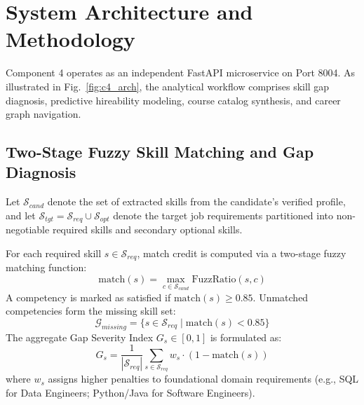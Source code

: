\documentclass[conference]{IEEEtran}
\begin{document}
\section{System Architecture and Methodology}
Component 4 operates as an independent FastAPI microservice on Port 8004. As illustrated in Fig.~\ref{fig:c4_arch}, the analytical workflow comprises skill gap diagnosis, predictive hireability modeling, course catalog synthesis, and career graph navigation.

\subsection{Two-Stage Fuzzy Skill Matching and Gap Diagnosis}
Let $\mathcal{S}_{cand}$ denote the set of extracted skills from the candidate's verified profile, and let $\mathcal{S}_{tgt} = \mathcal{S}_{req} \cup \mathcal{S}_{opt}$ denote the target job requirements partitioned into non-negotiable required skills and secondary optional skills.

For each required skill $s \in \mathcal{S}_{req}$, match credit is computed via a two-stage fuzzy matching function:
\begin{equation}
\text{match}(s) = \max_{c \in \mathcal{S}_{cand}} \text{FuzzRatio}(s, c)
\end{equation}
A competency is marked as satisfied if $\text{match}(s) \ge 0.85$. Unmatched competencies form the missing skill set:
\begin{equation}
\mathcal{G}_{missing} = \{s \in \mathcal{S}_{req} \mid \text{match}(s) < 0.85\}
\end{equation}
The aggregate Gap Severity Index $G_s \in [0, 1]$ is formulated as:
\begin{equation}
G_s = \frac{1}{|\mathcal{S}_{req}|} \sum_{s \in \mathcal{S}_{req}} w_s \cdot (1 - \text{match}(s))
\end{equation}
where $w_s$ assigns higher penalties to foundational domain requirements (e.g., SQL for Data Engineers; Python/Java for Software Engineers).
\end{document}

